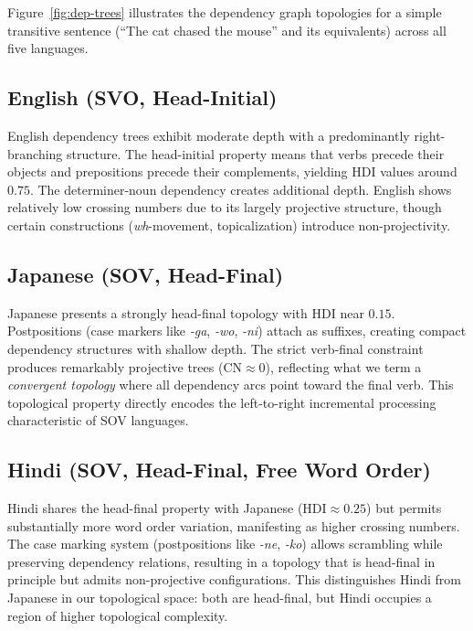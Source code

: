\documentclass[11pt,a4paper]{article}
\begin{document}
Figure~\ref{fig:dep-trees} illustrates the dependency graph topologies
for a simple transitive sentence (``The cat chased the mouse'' and its
equivalents) across all five languages.

\subsection{English (SVO, Head-Initial)}

English dependency trees exhibit moderate depth with a predominantly
right-branching structure. The head-initial property means that verbs
precede their objects and prepositions precede their complements,
yielding HDI values around $0.75$. The determiner-noun dependency
creates additional depth. English shows relatively low crossing numbers
due to its largely projective structure, though certain constructions
(\emph{wh}-movement, topicalization) introduce non-projectivity.

\subsection{Japanese (SOV, Head-Final)}

Japanese presents a strongly head-final topology with HDI near $0.15$.
Postpositions (case markers like \emph{-ga}, \emph{-wo}, \emph{-ni})
attach as suffixes, creating compact dependency structures with shallow
depth. The strict verb-final constraint produces remarkably projective
trees ($\mathrm{CN} \approx 0$), reflecting what we term a
\emph{convergent topology} where all dependency arcs point toward the
final verb. This topological property directly encodes the
left-to-right incremental processing characteristic of SOV languages.

\subsection{Hindi (SOV, Head-Final, Free Word Order)}

Hindi shares the head-final property with Japanese
($\mathrm{HDI} \approx 0.25$) but permits substantially more word
order variation, manifesting as higher crossing numbers. The case
marking system (postpositions like \emph{-ne}, \emph{-ko}) allows
scrambling while preserving dependency relations, resulting in a
topology that is head-final in principle but admits non-projective
configurations. This distinguishes Hindi from Japanese in our
topological space: both are head-final, but Hindi occupies a region of
higher topological complexity.
\end{document}
